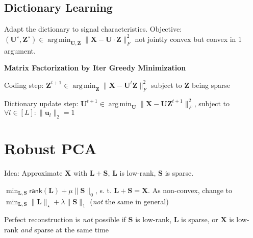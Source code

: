 \documentclass[a4paper, 11pt, landscape]{article}
\DeclareMathOperator*{\argmin}{arg\,min}
\begin{document}
\begin{multicols*}{3}
\subsection{Dictionary Learning}
Adapt the dictionary to signal characteristics. Objective: $(\mathbf{U}^\star, \mathbf{Z}^\star) \in \argmin_\mathbf{U,Z} \| \mathbf{X} - \mathbf{U} \cdot \mathbf{Z} \|_F^2$ not jointly convex but convex in 1 argument.

\textbf{Matrix Factorization by Iter Greedy Minimization}
\begin{inparaenum}
  \item Coding step: $\mathbf{Z}^{t+1} \in \argmin_\mathbf{Z} \| \mathbf{X} - \mathbf{U}^t \mathbf{Z} \|_F^2$ subject to $\mathbf{Z}$ being sparse
  \item Dictionary update step: $\mathbf{U}^{t+1} \in \argmin_\mathbf{U} \| \mathbf{X} - \mathbf{UZ}^{t+1} \|_F^2$, subject to $\forall l\in [L]:\|\mathbf{u}_l\|_2 = 1$
\end{inparaenum}

\section{Robust PCA}
\begin{compactitem}
	\item Idea: Approximate $\mathbf{X}$ with $\mathbf{L} + \mathbf{S}$, $\mathbf{L}$ is low-rank, $\mathbf{S}$ is sparse.
	\item $\min_{\mathbf{L},\mathbf{S}}\mathsf{rank}(\mathbf{L}) + \mu \lVert \mathbf{S}\rVert_0$, s. t. $\mathbf{L} + \mathbf{S} = \mathbf{X}$. As non-convex, change to $\min_{\mathbf{L},\mathbf{S}} \|\mathbf{L}\|_\star + \lambda \lVert\mathbf{S}\rVert_1$ (\emph{not} the same in general)
	\item Perfect reconstruction is \emph{not} possible if $\mathbf{S}$ is low-rank, $\mathbf{L}$ is sparse, or $\mathbf{X}$ is low-rank \textit{and} sparse at the same time
\end{compactitem}


\end{multicols*}
\end{document}
